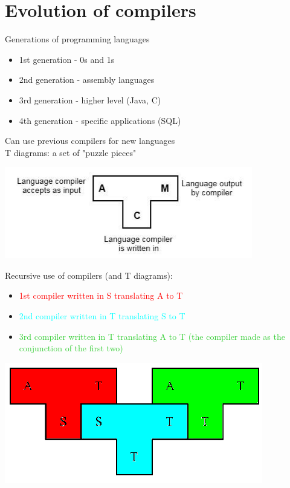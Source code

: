 \documentclass{article}[18pt]
\begin{document}
\section{Evolution of compilers}
Generations of programming languages
\begin{itemize}
	\item 1st generation - 0s and 1s
	\item 2nd generation - assembly languages
	\item 3rd generation - higher level (Java, C)
	\item 4th generation - specific applications (SQL)
\end{itemize}
Can use previous compilers for new languages\\
T diagrams: a set of "puzzle pieces"
\begin{center}
	\includegraphics[scale=0.7]{"T Diagram"}
\end{center}
Recursive use of compilers (and T diagrams):
\begin{itemize}
	\item \textcolor{red}{1st compiler written in S translating A to T}
	\item \textcolor{cyan}{2nd compiler written in T translating S to T}
	\item \textcolor{LimeGreen}{3rd compiler written in T translating A to T (the compiler made as the conjunction of the first two)}
\end{itemize}
\begin{center}
	\includegraphics[scale=0.7]{"Recursive Compiler"}
\end{center}
\end{document}
